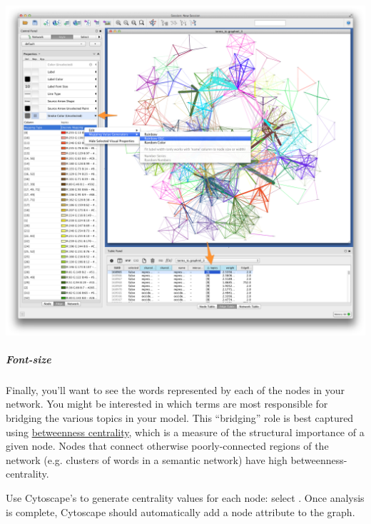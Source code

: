 \documentclass[letterpaper,10pt,english]{sphinxmanual}
\begin{document}
{\hfill\includegraphics{cytoscape2.png}\hfill}


\subparagraph{Font-size}
\label{tutorial.mallet:font-size}
Finally, you'll want to see the words represented by each of the nodes in your network.
You might be interested in which terms are most responsible for bridging the various
topics in your model. This ``bridging'' role is best captured using \href{http://en.wikipedia.org/wiki/Betweenness\_centrality}{betweenness
centrality}, which is a measure of
the structural importance of a given node. Nodes that connect otherwise poorly-connected
regions of the network (e.g. clusters of words in a semantic network) have high
betweenness-centrality.

Use Cytoscape's  to generate centrality values for each node: select
. Once analysis is
complete, Cytoscape should automatically add a  node attribute
to the graph.
\end{document}
